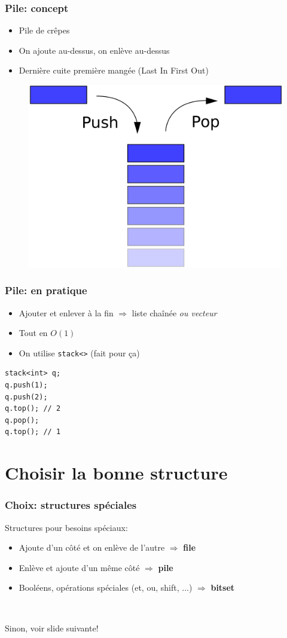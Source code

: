 \documentclass[12pt]{beamer}
\begin{document}
\begin{frame}
\frametitle{Pile: concept}
\begin{itemize}
\item Pile de crêpes
\item On ajoute au-dessus, on enlève au-dessus
\item Dernière cuite première mangée (Last In First Out)
\end{itemize}
\begin{figure}
\centering
\includegraphics[width=.5\textwidth]{img/stack}
\end{figure}
\end{frame}

\begin{frame}[fragile]
\frametitle{Pile: en pratique}
\begin{itemize}
\item Ajouter et enlever à la fin $\Rightarrow$ liste chaînée \emph{ou vecteur}
\item Tout en $O(1)$
\item On utilise \texttt{stack<>} (fait pour ça)
\end{itemize}
\begin{lstlisting}
stack<int> q;
q.push(1);
q.push(2);
q.top(); // 2
q.pop();
q.top(); // 1
\end{lstlisting}
\end{frame}

\section{Choisir la bonne structure}

\begin{frame}
\frametitle{Choix: structures spéciales}
Structures pour besoins spéciaux:
\begin{itemize}
\item Ajoute d'un côté et on enlève de l'autre $\Rightarrow$ \textbf{file}
\item Enlève et ajoute d'un même côté $\Rightarrow$ \textbf{pile}
\item Booléens, opérations spéciales (et, ou, shift, ...) $\Rightarrow$ \textbf{bitset}
\end{itemize}

~

Sinon, voir slide suivante!
\end{frame}
\end{document}
